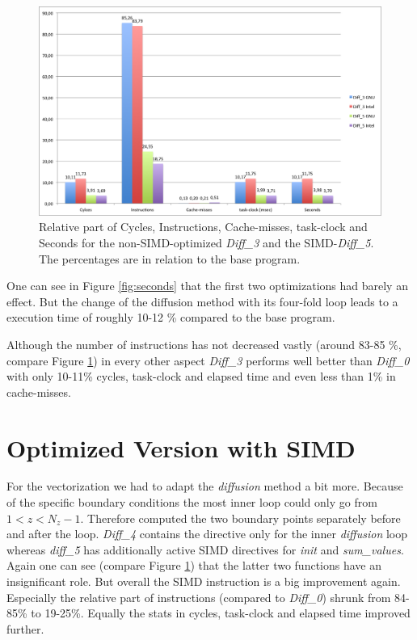\documentclass[12pt,a4paper]{article}
\begin{document}
\begin{figure}
	\centering
	\includegraphics[width=1.0\linewidth]{"Benchmark/percentage"}
	\caption{Relative part of Cycles, Instructions, Cache-misses, task-clock and Seconds for the non-SIMD-optimized \emph{Diff\_3} and the SIMD-\emph{Diff\_5}. The percentages are in relation to the base program.}
	\label{fig:percentage}
\end{figure}

One can see in Figure \ref{fig:seconds} that the first two optimizations had barely an effect. But the change of the diffusion method with its four-fold loop leads to a execution time of roughly 10-12 \% compared to the base program. 

Although the number of instructions has not decreased vastly (around 83-85 \%, compare Figure \ref{fig:percentage}) in every other aspect \emph{Diff\_3} performs well better than \emph{Diff\_0} with only 10-11\% cycles, task-clock and elapsed time and even less than 1\% in cache-misses. 

\section{Optimized Version with SIMD}\label{chp:optwsimd}

For the vectorization we had to adapt the \emph{diffusion} method a bit more. Because of the specific boundary conditions the most inner loop could only go from $ 1 < z < N_z - 1 $. Therefore computed the two boundary points separately before and after the loop. \emph{Diff\_4} contains the directive only for the inner \emph{diffusion} loop whereas \emph{diff\_5} has additionally active SIMD directives for \emph{init} and \emph{sum\_values}. Again one can see (compare Figure \ref{fig:percentage}) that the latter two functions have an insignificant role. But overall the SIMD instruction is a big improvement again. Especially the relative part of instructions (compared to \emph{Diff\_0}) shrunk from 84-85\% to 19-25\%. Equally the stats in cycles, task-clock and elapsed time improved further. 
\end{document}
